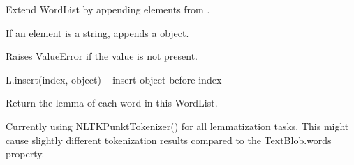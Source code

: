 \documentclass[letterpaper,10pt,english]{sphinxmanual}
\begin{document}
\begin{fulllineitems}
\begin{fulllineitems}
\begin{quote}
\begin{description}
\begin{itemize}
\end{itemize}

\end{description}\end{quote}

\end{fulllineitems}


\begin{fulllineitems}
\label{api_reference:textblob_de.blob.WordList.extend}
Extend WordList by appending elements from .

If an element
is a string, appends a {\hyperref[api_reference:textblob_de.blob.Word]{}} object.

\end{fulllineitems}


\begin{fulllineitems}
\label{api_reference:textblob_de.blob.WordList.index}
Raises ValueError if the value is not present.

\end{fulllineitems}


\begin{fulllineitems}
\label{api_reference:textblob_de.blob.WordList.insert}
L.insert(index, object) -- insert object before index

\end{fulllineitems}


\begin{fulllineitems}
\label{api_reference:textblob_de.blob.WordList.lemmatize}
Return the lemma of each word in this WordList.

Currently using NLTKPunktTokenizer() for all lemmatization
tasks. This might cause slightly different tokenization results
compared to the TextBlob.words property.

\end{fulllineitems}


\end{fulllineitems}
\end{document}
